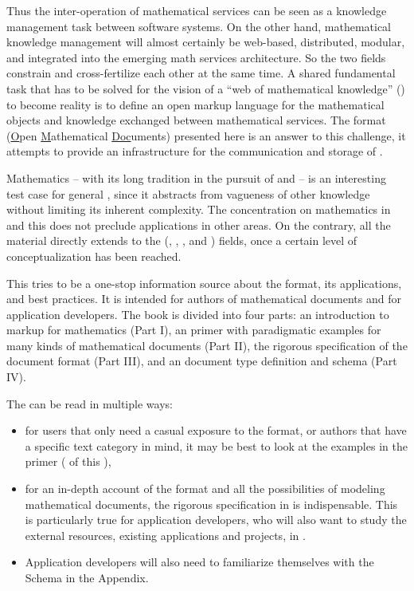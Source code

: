 Thus the inter-operation of mathematical services can be seen as a knowledge management
task between software systems. On the other hand, mathematical knowledge management will
almost certainly be web-based, distributed, modular, and integrated into the emerging math
services architecture. So the two fields constrain and cross-fertilize each other at the
same time.  A shared fundamental task that has to be solved for the vision of a ``web of
mathematical knowledge'' ({\mathweb}) to become reality is to define an open markup
language for the mathematical objects and knowledge exchanged between mathematical
services.  The {\omdoc} format (\underline{O}pen \underline{M}athematical
\underline{Doc}uments) presented here is an answer to this challenge, it attempts to
provide an infrastructure for the communication and storage of
{}.

Mathematics -- with its long tradition in the pursuit of {}
and {} -- is an interesting test case for general
{}, since it abstracts from vagueness of other knowledge
without limiting its inherent complexity. The concentration on mathematics in {\omdoc} and
this {\report} does not preclude applications in other areas. On the contrary, all the
material directly extends to the {} ({},
{}, {}, and {}) fields,
once a certain level of conceptualization has been reached.

This {\report} tries to be a one-stop information source about the {\omdoc} format, its
applications, and best practices. It is intended for authors of mathematical documents and
for application developers. The book is divided into four parts: an introduction to markup for
mathematics (Part I), an {\omdoc} primer with paradigmatic examples for many kinds of
mathematical documents (Part II), the rigorous specification of the {\omdoc} document
format (Part III), and an {\xml} document type definition and schema (Part IV).

The {\report} can be read in multiple ways: 
\begin{itemize}
\item for users that only need a casual exposure to the format, or authors that
  have a specific text category in mind, it may be best to look at the examples in
  the {\omdoc} primer ({} of this {\report}), 
\item for an in-depth account of the format and all the possibilities of modeling
  mathematical documents, the rigorous specification in
  {} is indispensable.  This is particularly true for
  application developers, who will also want to study the external resources,
  existing {\omdoc} applications and projects, in {}.
\item Application developers will also need to familiarize themselves with the {\omdoc}
  Schema in the Appendix.
\end{itemize}


